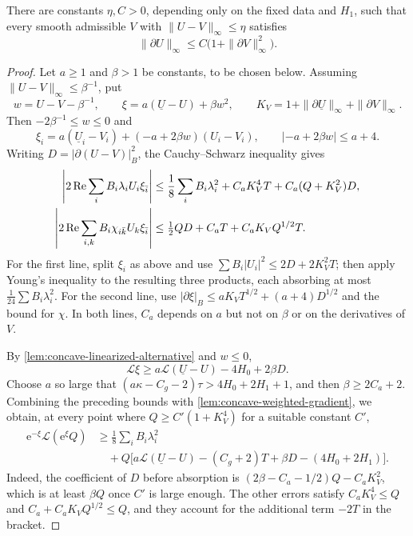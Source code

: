 \begin{proposition}\label{prop:concave-nearby-gradient}
There are constants $\eta,C>0$, depending only on the fixed data and $H_1$, such that every smooth admissible $V$ with $\|U-V\|_\infty\leq\eta$ satisfies
\[
 \|\partial U\|_\infty\leq C\bigl(1+\|\partial V\|_\infty^2\bigr).
\]
\end{proposition}
\begin{proof}
Let $a\geq1$ and $\beta>1$ be constants, to be chosen below. Assuming $\|U-V\|_\infty\leq\beta^{-1}$, put
\[
 w=U-V-\beta^{-1},\qquad
 \xi=a(\underline U-U)+\beta w^2,\qquad
 K_V=1+\|\partial\underline U\|_\infty+\|\partial V\|_\infty.
\]
Then $-2\beta^{-1}\leq w\leq0$ and
\[
 \xi_i=a(\underline U_i-V_i)+(-a+2\beta w)(U_i-V_i),
 \qquad |-a+2\beta w|\leq a+4.
\]
Writing $D=|\partial(U-V)|_B^2$, the Cauchy--Schwarz inequality gives
\begin{align*}
 \left|2\operatorname{Re}\sum_iB_i\lambda_iU_i\xi_{\bar i}\right|
 &\leq\frac18\sum_iB_i\lambda_i^2+C_aK_V^4T+C_a(Q+K_V^2)D,\\
 \left|2\operatorname{Re}\sum_{i,k}B_i\chi_{i\bar k}U_k\xi_{\bar i}\right|
 &\leq\tfrac12QD+C_aT+C_aK_VQ^{1/2}T.
\end{align*}
For the first line, split $\xi_i$ as above and use $\sum B_i|U_i|^2\leq2D+2K_V^2T$; then apply Young's inequality to the resulting three products, each absorbing at most $\frac1{24}\sum B_i\lambda_i^2$. For the second line, use $|\partial\xi|_B\leq aK_VT^{1/2}+(a+4)D^{1/2}$ and the bound for $\chi$. In both lines, $C_a$ depends on $a$ but not on $\beta$ or on the derivatives of $V$.

By \cref{lem:concave-linearized-alternative} and $w\leq0$,
\[
 \mathcal L\xi\geq a\mathcal L(\underline U-U)-4H_0+2\beta D.
\]
Choose $a$ so large that $(a\kappa-C_g-2)\tau>4H_0+2H_1+1$, and then $\beta\geq2C_a+2$. Combining the preceding bounds with \cref{lem:concave-weighted-gradient}, we obtain, at every point where $Q\geq C'(1+K_V^4)$ for a suitable constant $C'$,
\begin{align*}
 \mathrm e^{-\xi}\mathcal L(\mathrm e^\xi Q)
 &\geq\frac18\sum_iB_i\lambda_i^2\\
 &\quad+Q\bigl[a\mathcal L(\underline U-U)-(C_g+2)T
                 +\beta D-(4H_0+2H_1)\bigr].
\end{align*}
Indeed, the coefficient of $D$ before absorption is $(2\beta-C_a-1/2)Q-C_aK_V^2$, which is at least $\beta Q$ once $C'$ is large enough. The other errors satisfy $C_aK_V^4\leq Q$ and $C_a+C_aK_VQ^{1/2}\leq Q$, and they account for the additional term $-2T$ in the bracket.


\end{proof}
